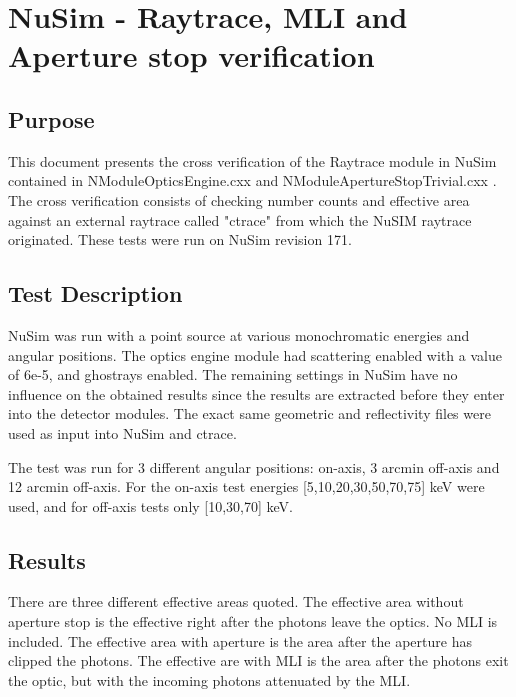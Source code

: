 



%

\chapter{NuSim - Raytrace, MLI and Aperture stop verification}
\section{Purpose}
This document presents the cross verification of the Raytrace module in NuSim contained in NModuleOpticsEngine.cxx and NModuleApertureStopTrivial.cxx . The cross verification consists of checking number counts and effective area against an external raytrace called "ctrace" from which the NuSIM raytrace originated. These tests were run on NuSim revision 171. 

\section{Test Description}
NuSim was run with a point source at various monochromatic energies and angular positions. The optics engine module had scattering enabled with a value of 6e-5, and ghostrays enabled. The remaining settings in NuSim have no influence on the obtained results since the results are extracted before they enter into the detector modules. The exact same geometric and reflectivity files were used as input into NuSim and ctrace.

The test was run for 3 different angular positions: on-axis, 3 arcmin off-axis and 12 arcmin off-axis. For the on-axis test energies [5,10,20,30,50,70,75] keV were used, and for off-axis tests only [10,30,70] keV. 

\section{Results}
There are three different effective areas quoted. The effective area without aperture stop is the effective right after the photons leave the optics. No MLI is included. The effective area with aperture is the area after the aperture has clipped the photons. The effective are with MLI is the area after the photons exit the optic, but with the incoming photons attenuated by the MLI. 

